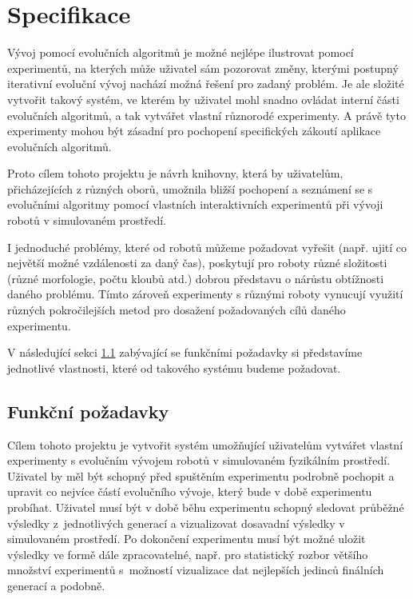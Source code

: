 \chapter{Specifikace} \label{chapter-specifikace}

Vývoj pomocí evolučních algoritmů je možné nejlépe ilustrovat pomocí
experimentů, na kterých může uživatel sám pozorovat změny, kterými postupný
iterativní evoluční vývoj nachází možná řešení pro zadaný problém. Je ale
složité vytvořit takový systém, ve kterém by uživatel mohl snadno ovládat
interní části evolučních algoritmů, a tak vytvářet vlastní různorodé
experimenty. A právě tyto experimenty mohou být zásadní pro pochopení
specifických zákoutí aplikace evolučních algoritmů.

Proto cílem tohoto projektu je návrh knihovny, která by uživatelům,
přicházejících z různých oborů, umožnila bližší pochopení a seznámení se s
evolučními algoritmy pomocí vlastních interaktivních experimentů při vývoji
robotů v simulovaném prostředí. 

I jednoduché problémy, které od robotů můžeme požadovat vyřešit (např. ujití co
největší možné vzdálenosti za daný čas), poskytují pro roboty různé složitosti
(různé morfologie, počtu kloubů atd.) dobrou představu o nárůstu obtížnosti
daného problému. Tímto zároveň experimenty s různými roboty vynucují využití
různých pokročilejších metod pro dosažení požadovaných cílů daného experimentu.

V následující sekci \ref{Specifikace-funkčnípožadavky} zabývající se funkčními
požadavky si představíme jednotlivé vlastnosti, které od takového systému
budeme požadovat.

\section{Funkční požadavky} \label{Specifikace-funkčnípožadavky}

Cílem tohoto projektu je vytvořit systém umožňující uživatelům vytvářet vlastní
experimenty s evolučním vývojem robotů v simulovaném fyzikálním prostředí.
Uživatel by měl být schopný před spuštěním experimentu podrobně pochopit a
upravit co nejvíce částí evolučního vývoje, který bude v době experimentu
probíhat. Uživatel musí být v době běhu experimentu schopný sledovat průběžné
výsledky z~jednotlivých generací a vizualizovat dosavadní výsledky v
simulovaném prostředí. Po dokončení experimentu musí být možné uložit výsledky
ve formě dále zpracovatelné, např. pro statistický rozbor většího množství
experimentů s~možností vizualizace dat nejlepších jedinců finálních generací a
podobně.

